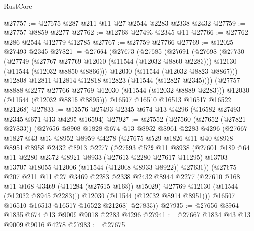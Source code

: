 \begin{lexlean}{RustCore}
\begin{coremodule}
@27757 := @27675 @287 @211 @11 @27 @2544 @2283 @2338 @2432
@27759 := @27757 @8859 @2277
@27762 := @12768 @27493 @2345 @11
@27766 := @27762 @286 @2544 @12779 @12785
@27767 := @27759 @27766
@27769 := @12025 @27493 @2345
@27821 := @27664
    (@27673
      (@27685
        (@27691
          (@27698
            (@27730
              (@27749
                (@27767 @27769 @12030 (@11544 (@12032 @8860 @2283)))
                @12030
                (@11544 (@12032 @8850 @8866)))
              @12030
              (@11544 (@12032 @8823 @8867)))
            @12808
            @12811
            @12814
            @12818
            @12823
            (@11544 (@12827 @2345))))
        (@27757 @8888 @2277 @27766 @27769 @12030 (@11544 (@12032 @8889 @2283)))
        @12030
        (@11544 (@12032 @8815 @8895)))
      @16507
      @16510
      @16513
      @16517
      @16522
      @21268)
@27833 := @13576 @27493 @2345 @674 @13 @4296 (@16582 @27493 @2345 @671 @13 @4295 @16594)
@27927 := @27552
    (@27560
      (@27652 (@27821 @27833))
      (@27656
        @8908
        @1828
        @674
        @13
        @8952
        @8961
        @2283
        @4296
        (@27667
          @1827
          @43
          @13
          @8952
          @8959
          @4278
          (@27675
            @529
            @1826
            @11
            @40
            @8938
            @8951
            @8958
            @2432
            @8913
            @2277
            (@27593
              @529
              @11
              @8938
              (@27601
                @189
                @64
                @11
                @2280
                @2372
                @8921
                @8933
                (@27613 @2280 @27617 @11295)
                @13703
                @13707
                @18055
                @12006
                (@11544 (@12008 @8933 @8922))
                @27630))
            (@27675
              @207
              @211
              @11
              @27
              @3469
              @2283
              @2338
              @2432
              @8944
              @2277
              (@27610 @168 @11 @168 @3469 (@11284 (@27615 @168)) @15029)
              @27769
              @12030
              (@11544 (@12032 @8945 @2283)))
            @12030
            (@11544 (@12032 @8914 @8951)))
          @16507
          @16510
          @16513
          @16517
          @16522
          @21268)
        @27833))
@27935 := @27656 @8964 @1835 @674 @13 @9009 @9018 @2283 @4296
@27941 := @27667 @1834 @43 @13 @9009 @9016 @4278
@27983 := @27675

\end{coremodule}
\end{lexlean}
